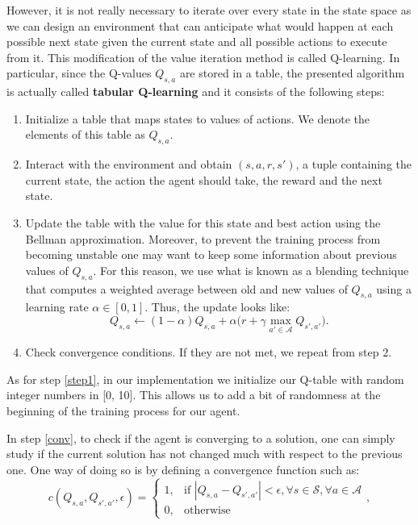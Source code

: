 \documentclass[11pt]{article}
\theoremstyle{definition}
\begin{document}
However, it is not really necessary to iterate over every state in the state space as we can design an environment that can anticipate what would happen at each possible next state given the current state and all possible actions to execute from it. This modification of the value iteration method is called Q-learning. In particular, since the Q-values $Q_{s, a}$ are stored in a table, the presented algorithm is actually called \textbf{tabular Q-learning} and it consists of the following steps:

\begin{enumerate}
    \item Initialize a table that maps states to values of actions. We denote the elements of this table as $Q_{s, a}$. \label{step1}
    \item Interact with the environment and obtain $(s, a, r, s')$, a tuple containing the current state, the action the agent should take, the reward and the next state. 
    \item Update the table with the value for this state and best action using the Bellman approximation. Moreover, to prevent the training process from becoming unstable one may want to keep some information about previous values of $Q_{s, a}$. For this reason, we use what is known as a blending technique that computes a weighted average between old and new values of $Q_{s, a}$ using a learning rate $\alpha \in [0, 1]$. Thus, the update looks like: 
    \begin{equation*}
        Q_{s, a} \leftarrow (1 - \alpha)Q_{s, a} + \alpha \big( r + \gamma \max_{a' \in \mathcal{A}} Q_{s', a'} \big).
    \end{equation*}
    \item Check convergence conditions. If they are not met, we repeat from step 2. \label{conv}
\end{enumerate}

As for step \ref{step1}, in our implementation we initialize our Q-table with random  integer numbers in [0, 10]. This allows us to add a bit of randomness at the beginning of the training process for our agent.

In step \ref{conv}, to check if the agent is converging to a solution, one can simply study if the current solution has not changed much with respect to the previous one. One way of doing so is by defining a convergence function such as: 
\begin{equation*}
    c(Q_{s, a}, Q_{s', a'}, \epsilon) = \begin{cases} 1, & \text{if }  |Q_{s, a} - Q_{s', a'}| < \epsilon, \forall s \in \mathcal{S}, \forall a \in \mathcal{A} \\ 0, & \text{otherwise} \end{cases},
\end{equation*}
\end{document}
